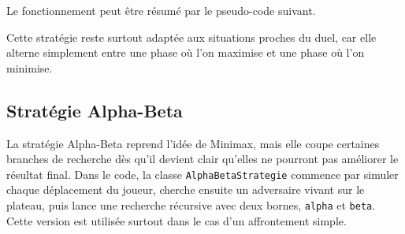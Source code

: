 \documentclass[11pt,a4paper]{article}
\begin{document}
Le fonctionnement peut être résumé par le pseudo-code suivant.

\begin{algorithm}[H]
\DontPrintSemicolon
{}

\caption{Algorithme Minimax}
\end{algorithm}

\vspace{1cm}

Cette stratégie reste surtout adaptée aux situations proches du duel, car elle alterne simplement entre une phase où l'on maximise et une phase où l'on minimise.

\subsection{Stratégie Alpha-Beta}

La stratégie Alpha-Beta reprend l'idée de Minimax, mais elle coupe certaines branches de recherche dès qu'il devient clair qu'elles ne pourront pas améliorer le résultat final. Dans le code, la classe \texttt{AlphaBetaStrategie} commence par simuler chaque déplacement du joueur, cherche ensuite un adversaire vivant sur le plateau, puis lance une recherche récursive avec deux bornes, \texttt{alpha} et \texttt{beta}. Cette version est utilisée surtout dans le cas d'un affrontement simple.
\end{document}
